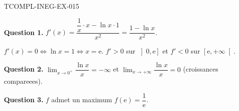 \begin{corrige}{TCOMPL-INEG-EX-015}

\textbf{Question 1.} $f'(x) = \dfrac{\dfrac{1}{x} \cdot x - \ln x \cdot 1}{x^2} = \dfrac{1 - \ln x}{x^2}$.


$f'(x) = 0 \iff \ln x = 1 \iff x = \mathrm{e}$. $f' > 0$ sur $\left]0, \mathrm{e}\right]$ et $f' < 0$ sur $\left[\mathrm{e}, +\infty\right[$.

\textbf{Question 2.} $\lim_{x \to 0^+} \dfrac{\ln x}{x} = -\infty$ et $\lim_{x \to +\infty} \dfrac{\ln x}{x} = 0$ (croissances compareees).

\textbf{Question 3.} $f$ admet un maximum $f(\mathrm{e}) = \dfrac{1}{\mathrm{e}}$.

\end{corrige}
